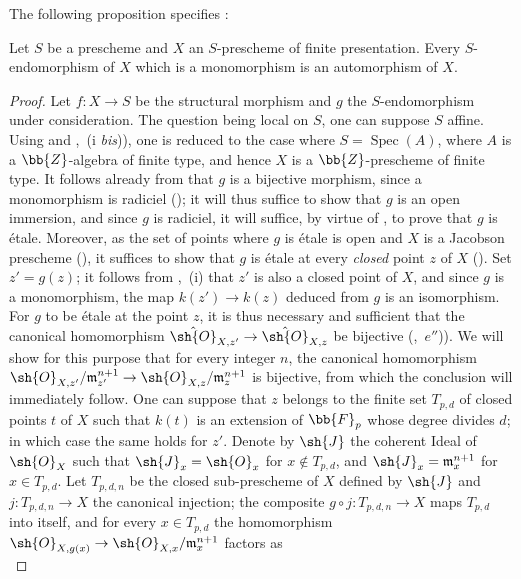 The following proposition specifies :
\begin{proposition}[17.9.6]
\label{IV.17.9.6}
Let $S$ be a prescheme and $X$ an $S$-prescheme of finite presentation.
Every $S$-endomorphism of $X$ which is a monomorphism is an automorphism of $X$.
\end{proposition}

\begin{proof}
Let $f:X\to S$ be the structural morphism and $g$ the $S$-endomorphism under consideration.
The question being local on $S$, one can suppose $S$ affine.
Using  and ,~(i \emph{bis})), one is reduced to the case where $S=\operatorname{Spec}(A)$, where $A$ is a $\bb{Z}$-algebra of finite type, and hence $X$ is a $\bb{Z}$-prescheme of finite type.
It follows already from  that $g$ is a bijective morphism, since a monomorphism is radiciel (); it will thus suffice to show that $g$ is an open immersion, and since $g$ is radiciel, it will suffice, by virtue of , to prove that $g$ is \'etale.
Moreover, as the set of points where $g$ is \'etale is open and $X$ is a Jacobson prescheme (), it suffices to show that $g$ is \'etale at every \emph{closed} point $z$ of $X$ ().
Set $z'=g(z)$; it follows from ,~(i) that $z'$ is also a closed point of $X$, and since $g$ is a monomorphism, the map $k(z')\to k(z)$ deduced from $g$ is an isomorphism.
For $g$ to be \'etale at the point $z$, it is thus necessary and sufficient that the canonical homomorphism $\hat{\sh{O}}_{X,z'}\to\hat{\sh{O}}_{X,z}$ be bijective (,~$e''$)).
We will show for this purpose that for every integer $n$, the canonical homomorphism $\sh{O}_{X,z'}/\mathfrak{m}_{z'}^{n+1}\to\sh{O}_{X,z}/\mathfrak{m}_z^{n+1}$ is bijective, from which the conclusion will immediately follow.
One can suppose that $z$ belongs to the finite set $T_{p,d}$ of closed points $t$ of $X$ such that $k(t)$ is an extension of $\bb{F}_p$ whose degree divides $d$; in which case the same holds for $z'$.
Denote by $\sh{J}$ the coherent Ideal of $\sh{O}_X$ such that $\sh{J}_x=\sh{O}_x$ for $x\notin T_{p,d}$, and $\sh{J}_x=\mathfrak{m}_x^{n+1}$ for $x\in T_{p,d}$.
Let $T_{p,d,n}$ be the closed sub-prescheme of $X$ defined by $\sh{J}$ and $j:T_{p,d,n}\to X$ the canonical injection; the composite $g\circ j:T_{p,d,n}\to X$ maps $T_{p,d}$ into itself, and for every $x\in T_{p,d}$ the homomorphism $\sh{O}_{X,g(x)}\to\sh{O}_{X,x}/\mathfrak{m}_x^{n+1}$ factors as
\[
\]
\end{proof}
